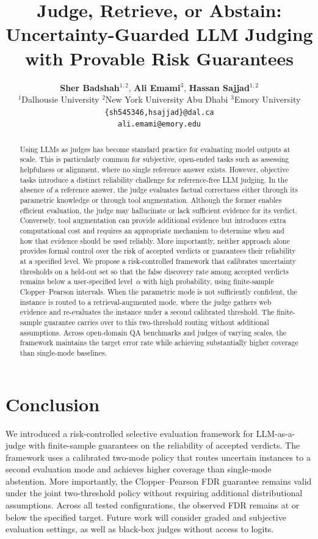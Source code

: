 \documentclass{article} %
\title{Judge, Retrieve, or Abstain: Uncertainty-Guarded LLM Judging with Provable Risk Guarantees}
\author{%
\textbf{Sher Badshah}$^{1,2}$, \textbf{Ali Emami}$^{3}$, \textbf{Hassan Sajjad}$^{1,2}$ \\
$^{1}$Dalhousie University \quad $^{2}$New York University Abu Dhabi \quad $^{3}$Emory University \\
\texttt{\{sh545346,hsajjad\}@dal.ca} \\
\texttt{ali.emami@emory.edu}%
}
\begin{document}
\ifcolmsubmission
\linenumbers
\fi

\maketitle

\begin{abstract}
Using LLMs as judges has become standard practice for evaluating model outputs at scale. This is particularly common for subjective, open-ended tasks such as assessing helpfulness or alignment, where no single reference answer exists. However, objective tasks introduce a distinct reliability challenge for reference-free LLM judging. In the absence of a reference answer, the judge evaluates factual correctness either through its parametric knowledge or through tool augmentation. Although the former enables efficient evaluation, the judge may hallucinate or lack sufficient evidence for its verdict. Conversely, tool augmentation can provide additional evidence but introduces extra computational cost and requires an appropriate mechanism to determine when and how that evidence should be used reliably. More importantly, neither approach alone provides formal control over the risk of accepted verdicts or guarantees their reliability at a specified level. We propose a risk-controlled framework that calibrates uncertainty thresholds on a held-out set so that the false discovery rate among accepted verdicts remains below a user-specified level~$\alpha$ with high probability, using finite-sample Clopper--Pearson intervals. When the parametric mode is not sufficiently confident, the instance is routed to a retrieval-augmented mode, where the judge gathers web evidence and re-evaluates the instance under a second calibrated threshold. The finite-sample guarantee carries over to this two-threshold routing without additional assumptions. Across open-domain QA benchmarks and judges of varying scales, the framework maintains the target error rate while achieving substantially higher coverage than single-mode baselines.
\end{abstract}






\section{Conclusion}
We introduced a risk-controlled selective evaluation framework for LLM-as-a-judge with finite-sample guarantees on the reliability of accepted verdicts. The framework uses a calibrated two-mode policy that routes uncertain instances to a second evaluation mode and achieves higher coverage than single-mode abstention. More importantly, the Clopper--Pearson FDR guarantee remains valid under the joint two-threshold policy without requiring additional distributional assumptions. Across all tested configurations, the observed FDR remains at or below the specified target. Future work will consider graded and subjective evaluation settings, as well as black-box judges without access to logits.
\end{document}
